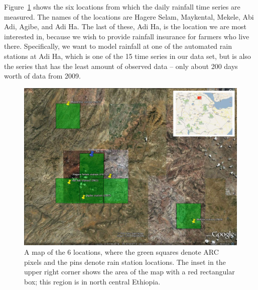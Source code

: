 \documentclass[11pt]{article}
\begin{document}
Figure~\ref{fig_ethiopia_map} shows the six locations from which the daily rainfall time series are measured. The names of the locations are Hagere Selam, Maykental, Mekele, Abi Adi, Agibe, and Adi Ha. The last of these, Adi Ha, is the location we are most interested in, because we wish to provide rainfall insurance for farmers who live there. Specifically, we want to model rainfall at one of the automated rain stations at Adi Ha, which is one of the 15 time series in our data set, but is also the series that has the least amount of observed data -- only about 200 days worth of data from 2009.

\begin{figure}[htbp]
\begin{center}
\includegraphics[width=4.5in]{fig_ethiopia_papermap.jpg}
\caption{A map of the 6 locations, where the green squares denote ARC pixels and the pins denote rain station locations. The inset in the upper right corner shows the area of the map with a red rectangular box; this region is in north central Ethiopia.}
\label{fig_ethiopia_map}
\end{center}
\end{figure}
\end{document}

